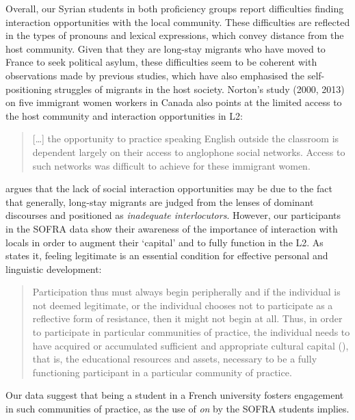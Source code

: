 \documentclass[output=paper]{langscibook}
\begin{document}
Overall, our Syrian students in both proficiency groups report difficulties finding interaction opportunities with the local community. These difficulties are reflected in the types of pronouns and lexical expressions, which convey distance from the host community. Given that they are long-stay migrants who have moved to France to seek political asylum, these difficulties seem to be coherent with observations made by previous studies, which have also emphasised the self-positioning struggles of migrants in the host society. Norton's study (2000, 2013) on five immigrant women workers in Canada also points at the limited access to the host community and interaction opportunities in L2:

\begin{quote}
[…] the opportunity to practice speaking English outside the classroom is dependent largely on their access to anglophone social networks. Access to such networks was difficult to achieve for these immigrant women.\\\hbox{}\hfill\hbox{\citep[135]{Norton2000}}
\end{quote}

\citet[79]{Block2007a} argues that the lack of social interaction opportunities may be due to the fact that generally, long-stay migrants are judged from the lenses of dominant discourses and positioned as \textit{inadequate interlocutors}. However, our participants in the SOFRA data show their awareness of the importance of interaction with locals in order to augment their ‘capital’ and to fully function in the L2. As \citet{Block2007a} states it, feeling legitimate is an essential condition for effective personal and linguistic development:

\begin{quote}
Participation thus must always begin peripherally and if the individual is not deemed legitimate, or the individual chooses not to participate as a reflective form of resistance, then it might not begin at all. Thus, in order to participate in particular communities of practice, the individual needs to have acquired or accumulated sufficient and appropriate cultural capital (\citealt{Bourdieu1977, Bourdieu1984}), that is, the educational resources and assets, necessary to be a fully functioning participant in a particular community of practice.\hfill\hbox{\citep[25]{Block2007a}}
\end{quote}

Our data suggest that being a student in a French university fosters engagement in such communities of practice, as the use of \textit{on} by the SOFRA students implies.
\end{document}
